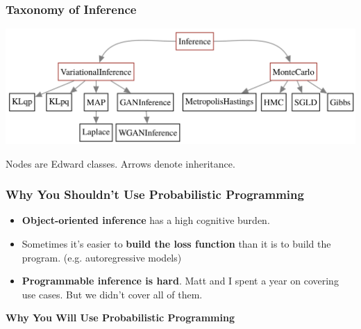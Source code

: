 \documentclass[10pt,
               xcolor={usenames,dvipsnames},
               hyperref={colorlinks,linktoc=all,citecolor=Plum,linkcolor=MidnightBlue,urlcolor=MidnightBlue},noamssymb]{beamer}
\begin{document}
\begin{frame}
\frametitle{Taxonomy of Inference}
\vspace{-1ex}
\begin{center}
\includegraphics[width=1.05\textwidth]{img/taxonomy.png}
\end{center}
\vspace{10ex}
Nodes are Edward classes. Arrows denote inheritance.
\end{frame}

\begin{frame}
\frametitle{Why You Shouldn't Use Probabilistic Programming}
\begin{itemize}
\item
\textbf{Object-oriented inference} has a high cognitive burden.
\item
Sometimes it's easier to \textbf{build the loss function} than it
is to build the program.
(e.g. autoregressive models)
\item
\textbf{Programmable inference is hard}. Matt and I spent a year on
covering use cases. But we didn't cover all of them.
\end{itemize}
\end{frame}

\begin{frame}
\begin{center}
{\Large\bf Why You Will Use Probabilistic Programming}
\end{center}
\end{frame}
\end{document}
